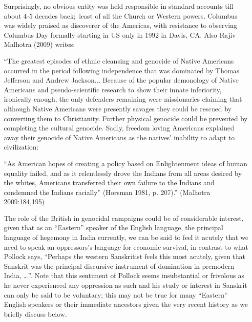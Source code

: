 Surprisingly, no obvious entity was held responsible in standard accounts till about 4-5 decades back; least of all the Church or Western powers. Columbus was widely praised as discoverer of the Americas, with resistance to observing Columbus Day formally starting in US only in 1992 in Davis, CA. Also Rajiv Malhotra (2009) writes: 
\begin{myquote}
“The greatest episodes of ethnic cleansing and genocide of Native Americans occurred in the period following independence that was dominated by Thomas Jefferson and Andrew Jackson... Because of the popular demonology of Native Americans and pseudo-scientific research to show their innate inferiority, ironically enough, the only defenders remaining were missionaries claiming that although Native Americans were presently savages they could be rescued by converting them to Christianity. Further physical genocide could be prevented by
completing the cultural genocide. Sadly, freedom loving Americans explained away their genocide of Native Americans as the natives’ inability to adapt to civilization: 

“As American hopes of creating a policy based on Enlightenment ideas of human equality failed, and as it relentlessly drove the Indians from all areas desired by the whites, Americans transferred their own failure to the Indians and condemned the Indians racially” (Horsman 1981, p. 207).”   	\hfill(Malhotra 2009:184,195)
\end{myquote}

The role of the British in genocidal campaigns could be of considerable interest, given that as an “Eastern” speaker of the English language, the principal language of hegemony in India currently, we can be said to feel it acutely that we need to speak an oppressors’s language for economic survival, in contrast to what Pollock says, “Perhaps the western Sanskritist feels this most acutely, given that Sanskrit was the principal discursive instrument of domination in premodern India, …”. Note that this sentiment of Pollock seems insubstantial or frivolous as he never experienced any oppression as such and his study or interest in Sanskrit can only be said to be voluntary; this may not be true for many “Eastern” English speakers or their immediate ancestors given the very recent history as we briefly discuss below.

